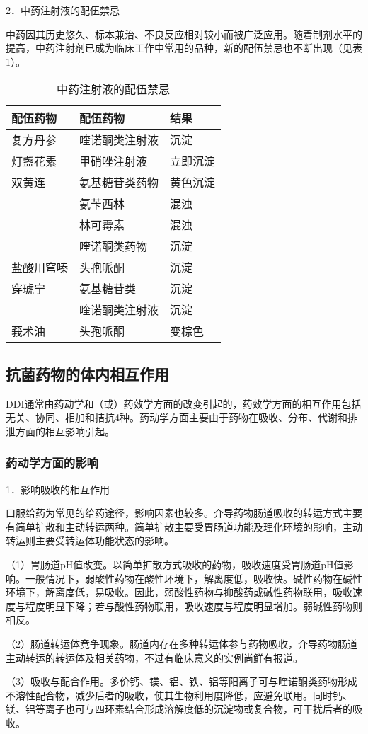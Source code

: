 2．中药注射液的配伍禁忌

中药因其历史悠久、标本兼治、不良反应相对较小而被广泛应用。随着制剂水平的提高，中药注射剂已成为临床工作中常用的品种，新的配伍禁忌也不断出现（见表\ref{tab8-2}）。

\begin{longtable}[]{@{}lll@{}}
    \caption{中药注射液的配伍禁忌}
\label{tab8-2}\\
\toprule
\endhead
配伍药物 & 配伍药物 & 结果\tabularnewline
\midrule
复方丹参 & 喹诺酮类注射液 & 沉淀\tabularnewline
灯盏花素 & 甲硝唑注射液 & 立即沉淀\tabularnewline
双黄连 & 氨基糖苷类药物 & 黄色沉淀\tabularnewline
& 氨苄西林 & 混浊\tabularnewline
& 林可霉素 & 混浊\tabularnewline
& 喹诺酮类药物 & 沉淀\tabularnewline
盐酸川穹嗪 & 头孢哌酮 & 沉淀\tabularnewline
穿琥宁 & 氨基糖苷类 & 沉淀\tabularnewline
& 喹诺酮类注射液 & 沉淀\tabularnewline
莪术油 & 头孢哌酮 & 变棕色\tabularnewline
\bottomrule
\end{longtable}

\subsection{抗菌药物的体内相互作用}

DDI通常由药动学和（或）药效学方面的改变引起的，药效学方面的相互作用包括无关、协同、相加和拮抗4种。药动学方面主要由于药物在吸收、分布、代谢和排泄方面的相互影响引起。

\subsubsection{药动学方面的影响}

1．影响吸收的相互作用

口服给药为常见的给药途径，影响因素也较多。介导药物肠道吸收的转运方式主要有简单扩散和主动转运两种。简单扩散主要受胃肠道功能及理化环境的影响，主动转运则主要受转运体功能状态的影响。

（1）胃肠道pH值改变。以简单扩散方式吸收的药物，吸收速度受胃肠道pH值影响。一般情况下，弱酸性药物在酸性环境下，解离度低，吸收快。碱性药物在碱性环境下，解离度低，易吸收。因此，弱酸性药物与抑酸药或碱性药物联用，吸收速度与程度明显下降；若与酸性药物联用，吸收速度与程度明显增加。弱碱性药物则相反。

（2）肠道转运体竞争现象。肠道内存在多种转运体参与药物吸收，介导药物肠道主动转运的转运体及相关药物，不过有临床意义的实例尚鲜有报道。

（3）吸收与配合作用。多价钙、镁、铝、铁、铝等阳离子可与喹诺酮类药物形成不溶性配合物，减少后者的吸收，使其生物利用度降低，应避免联用。同时钙、镁、铝等离子也可与四环素结合形成溶解度低的沉淀物或复合物，可干扰后者的吸收。

